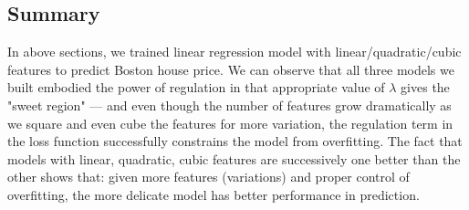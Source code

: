 \documentclass[english,11pt]{article}
\begin{document}
\subsection*{ Summary}
In above sections, we trained linear regression model with linear/quadratic/cubic features to predict Boston house price. We can observe that all three models we built embodied the power of regulation in that appropriate value of $\lambda$ gives the "sweet region" --- and even though the number of features grow dramatically as we square and even cube the features for more variation, the regulation term in the loss function successfully constrains the model from overfitting. The fact that models with linear, quadratic, cubic features are successively one better than the other shows that: given more features (variations) and proper control of overfitting, the more delicate model has better performance in prediction.
\end{document}
